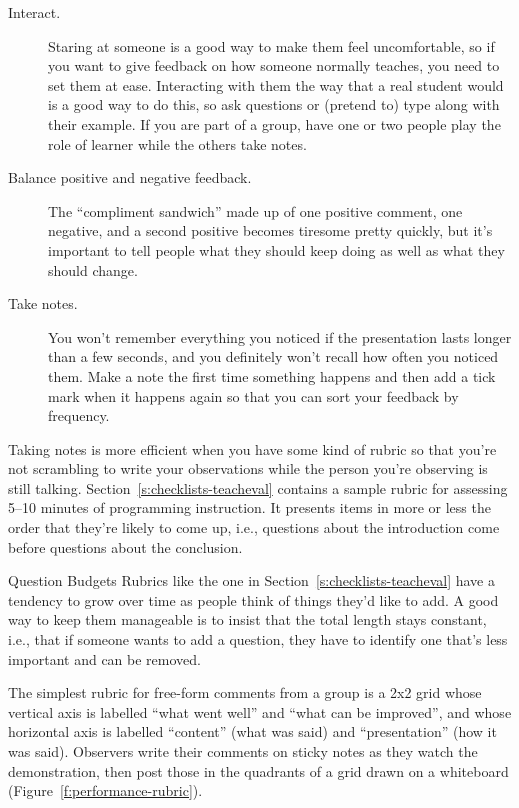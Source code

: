 \begin{description}

\item[Interact.]
  Staring at someone is a good way to make them feel uncomfortable,
  so if you want to give feedback on how someone normally teaches,
  you need to set them at ease.
  Interacting with them the way that a real student would is a good way to do this,
  so ask questions or (pretend to) type along with their example.
  If you are part of a group,
  have one or two people play the role of learner
  while the others take notes.

\item[Balance positive and negative feedback.]
  The ``compliment sandwich'' made up of one positive comment,
  one negative,
  and a second positive
  becomes tiresome pretty quickly,
  but it's important to tell people what they should keep doing
  as well as what they should change.

\item[Take notes.]
  You won't remember everything you noticed
  if the presentation lasts longer than a few seconds,
  and you definitely won't recall how often you noticed them.
  Make a note the first time something happens
  and then add a tick mark when it happens again
  so that you can sort your feedback by frequency.

\end{description}

Taking notes is more efficient when you have some kind of rubric
so that you're not scrambling to write your observations
while the person you're observing is still talking.
Section~\ref{s:checklists-teacheval} contains a sample rubric
for assessing 5--10 minutes of programming instruction.
It presents items in more or less the order that they're likely to come up,
i.e.,
questions about the introduction come before questions about the conclusion.

\begin{aside}{Question Budgets}
  Rubrics like the one in Section~\ref{s:checklists-teacheval}
  have a tendency to grow over time as people think of things they'd like to add.
  A good way to keep them manageable is to insist that
  the total length stays constant,
  i.e.,
  that if someone wants to add a question,
  they have to identify one that's less important and can be removed.
\end{aside}

The simplest rubric for free-form comments from a group
is a 2x2 grid whose vertical axis is labelled ``what went well'' and ``what can be improved'',
and whose horizontal axis is labelled ``content'' (what was said)
and ``presentation'' (how it was said).
Observers write their comments on sticky notes as they watch the demonstration,
then post those in the quadrants of a grid drawn on a whiteboard
(Figure~\ref{f:performance-rubric}).


